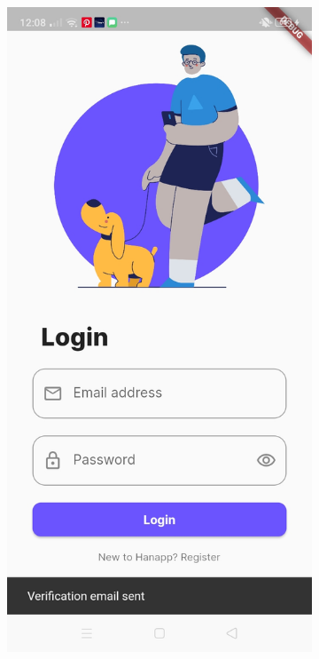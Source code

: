 \begin{figure}[!h]
\begin{subfigure}[c]{0.30\linewidth}
    \end{subfigure}
    \centering
    \begin{subfigure}[c]{0.30\linewidth}
        \centering
        \includegraphics[scale=0.15]{figures/Chapter4/Main/Verification-4.jpg}

\end{subfigure}
\end{figure}
